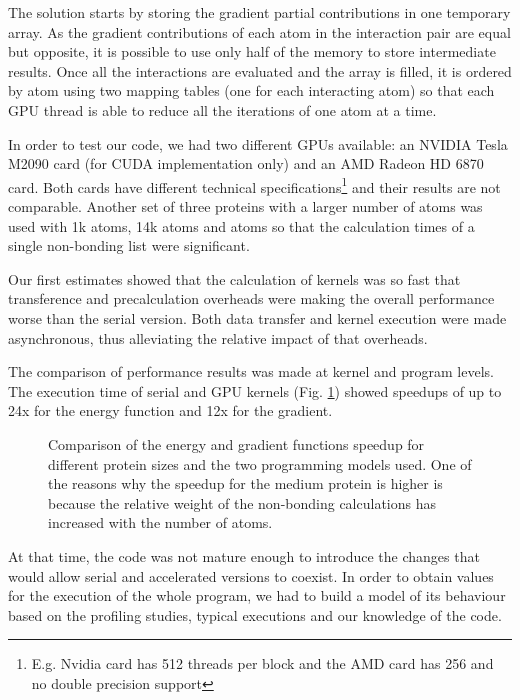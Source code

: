 The solution starts by storing the gradient partial contributions in one temporary array. As the gradient contributions
of each atom in the interaction pair are equal but opposite, it is possible to use only half of the memory to store
intermediate results. Once all the interactions are evaluated and the array is filled, it is  ordered by atom using
two mapping tables (one for each interacting atom) so that each GPU thread is able to reduce all the iterations of one atom
at a time.

In order to test our code, we had two different GPUs available: an NVIDIA Tesla M2090 card (for CUDA implementation only)
and an AMD Radeon HD 6870 card. Both cards have different technical specifications\footnote{E.g. Nvidia card has 512
threads per block and the AMD card has 256 and no double precision support} and their results are not
comparable. Another set of three proteins with a larger number of atoms was used with \around 1k atoms, \around 14k atoms and
 atoms so that the calculation times of a single non-bonding list were significant.

Our first estimates showed that the calculation of kernels was so fast that transference and precalculation overheads were
making the overall performance worse than the serial version. Both data transfer and kernel execution were made asynchronous, thus
alleviating the relative impact of that overheads. 

The comparison of performance results was made at kernel and program levels. The execution time of serial and GPU
kernels (Fig. \ref{fig:cuda_speedup}) showed speedups of up to 24x for the energy function and 12x for
the gradient.

\begin{figure}


\caption{Comparison of the energy and gradient functions speedup for different protein sizes and the two
programming models used. One of the reasons why the speedup for the medium protein is higher is because the relative
weight of the non-bonding calculations has increased with the number of atoms.}

\label{fig:cuda_speedup}

\end{figure}

At that time, the code was not mature enough to introduce the changes that would allow serial and accelerated versions
to coexist. In order to obtain values for the execution of the whole program, we had to build a model of its behaviour based on the profiling studies, typical executions and our knowledge of the code.

